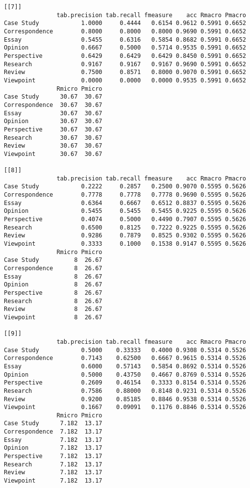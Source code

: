 \documentclass[]{article}
\begin{document}
\begin{lstlisting}[frame=single]
[[7]]
               tab.precision tab.recall fmeasure    acc Rmacro Pmacro
Case Study            1.0000     0.4444   0.6154 0.9612 0.5991 0.6652
Correspondence        0.8000     0.8000   0.8000 0.9690 0.5991 0.6652
Essay                 0.5455     0.6316   0.5854 0.8682 0.5991 0.6652
Opinion               0.6667     0.5000   0.5714 0.9535 0.5991 0.6652
Perspective           0.6429     0.6429   0.6429 0.8450 0.5991 0.6652
Research              0.9167     0.9167   0.9167 0.9690 0.5991 0.6652
Review                0.7500     0.8571   0.8000 0.9070 0.5991 0.6652
Viewpoint             0.0000     0.0000   0.0000 0.9535 0.5991 0.6652
               Rmicro Pmicro
Case Study      30.67  30.67
Correspondence  30.67  30.67
Essay           30.67  30.67
Opinion         30.67  30.67
Perspective     30.67  30.67
Research        30.67  30.67
Review          30.67  30.67
Viewpoint       30.67  30.67

[[8]]
               tab.precision tab.recall fmeasure    acc Rmacro Pmacro
Case Study            0.2222     0.2857   0.2500 0.9070 0.5595 0.5626
Correspondence        0.7778     0.7778   0.7778 0.9690 0.5595 0.5626
Essay                 0.6364     0.6667   0.6512 0.8837 0.5595 0.5626
Opinion               0.5455     0.5455   0.5455 0.9225 0.5595 0.5626
Perspective           0.4074     0.5000   0.4490 0.7907 0.5595 0.5626
Research              0.6500     0.8125   0.7222 0.9225 0.5595 0.5626
Review                0.9286     0.7879   0.8525 0.9302 0.5595 0.5626
Viewpoint             0.3333     0.1000   0.1538 0.9147 0.5595 0.5626
               Rmicro Pmicro
Case Study          8  26.67
Correspondence      8  26.67
Essay               8  26.67
Opinion             8  26.67
Perspective         8  26.67
Research            8  26.67
Review              8  26.67
Viewpoint           8  26.67

[[9]]
               tab.precision tab.recall fmeasure    acc Rmacro Pmacro
Case Study            0.5000    0.33333   0.4000 0.9308 0.5314 0.5526
Correspondence        0.7143    0.62500   0.6667 0.9615 0.5314 0.5526
Essay                 0.6000    0.57143   0.5854 0.8692 0.5314 0.5526
Opinion               0.5000    0.43750   0.4667 0.8769 0.5314 0.5526
Perspective           0.2609    0.46154   0.3333 0.8154 0.5314 0.5526
Research              0.7586    0.88000   0.8148 0.9231 0.5314 0.5526
Review                0.9200    0.85185   0.8846 0.9538 0.5314 0.5526
Viewpoint             0.1667    0.09091   0.1176 0.8846 0.5314 0.5526
               Rmicro Pmicro
Case Study      7.182  13.17
Correspondence  7.182  13.17
Essay           7.182  13.17
Opinion         7.182  13.17
Perspective     7.182  13.17
Research        7.182  13.17
Review          7.182  13.17
Viewpoint       7.182  13.17


\end{lstlisting}
\end{document}
